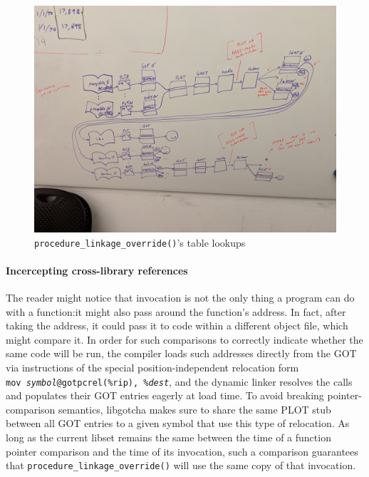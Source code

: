 \begin{figure}
\includegraphics[width=\columnwidth]{figs/tables}
\caption{\texttt{procedure\_linkage\_override()}'s table lookups}
\label{fig:override}
\end{figure}

\paragraph{Incercepting cross-library references}

The reader might notice that invocation is not the only thing a program can do with a
function:\@ it might also pass around the function's address.  In fact, after taking
the address, it could pass it to code within a different object file, which might
compare it.  In order for such comparisons to correctly indicate whether the same
code will be run, the compiler loads such addresses directly from the GOT via
instructions of the special position-independent relocation form
\texttt{mov~\textit{symbol}@gotpcrel(\%rip),~\%\textit{dest}}, and the dynamic linker
resolves the calls and populates their GOT entries eagerly at load time.  To avoid
breaking pointer-comparison semantics, libgotcha makes sure to share the same PLOT
stub between all GOT entries to a given symbol that use this type of
relocation.  As long as the current libset remains the same between the time of a
function pointer comparison and the time of its invocation, such a comparison
guarantees that \texttt{procedure\_linkage\_override()} will use the same copy of
that invocation.


